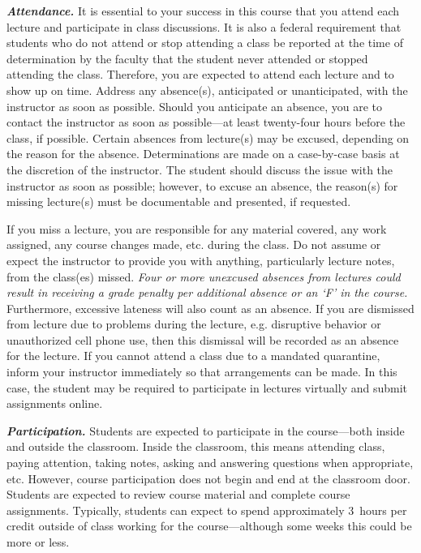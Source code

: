 \documentclass[11pt,letterpaper]{article}
\begin{document}
{\itshape\bfseries\color{stacred}Attendance.} It is essential to your success in this course that you attend each lecture and participate in class discussions. It is also a federal requirement that students who do not attend or stop attending a class be reported at the time of determination by the faculty that the student never attended or stopped attending the class. Therefore, you are expected to attend each lecture and to show up on time. Address any absence(s), anticipated or unanticipated, with the instructor as soon as possible. Should you anticipate an absence, you are to contact the instructor as soon as possible---at least twenty-four hours before the class, if possible.  Certain absences from lecture(s) may be excused, depending on the reason for the absence. Determinations are made on a case-by-case basis at the discretion of the instructor. The student should discuss the issue with the instructor as soon as possible; however, to excuse an absence, the reason(s) for missing lecture(s) must be documentable and presented, if requested. \pspace

If you miss a lecture, you are responsible for any material covered, any work assigned, any course changes made, etc. during the class. Do not assume or expect the instructor to provide you with anything, particularly lecture notes, from the class(es) missed. {\itshape Four or more unexcused absences from lectures could result in receiving a grade penalty per additional absence or an `F' in the course.} Furthermore, excessive lateness will also count as an absence. If you are dismissed from lecture due to problems during the lecture, e.g. disruptive behavior or unauthorized cell phone use, then this dismissal will be recorded as an absence for the lecture. If you cannot attend a class due to a mandated quarantine, inform your instructor immediately so that arrangements can be made. In this case, the student may be required to participate in lectures virtually and submit assignments online. \pspace

{\itshape\bfseries\color{stacred}Participation.} 
Students are expected to participate in the course---both inside and outside the classroom. Inside the classroom, this means attending class, paying attention, taking notes, asking and answering questions when appropriate, etc. However, course participation does not begin and end at the classroom door. Students are expected to review course material and complete course assignments. Typically, students can expect to spend approximately 3~hours per credit outside of class working for the course---although some weeks this could be more or less. \pspace
\end{document}

